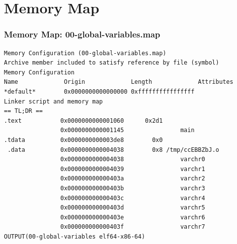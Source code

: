 \documentclass[xcolor=table, notheorems, hyperref={pdfpagelabels=false}]{beamer}
\begin{document}
\section{Memory Map}
\begin{frame}[fragile]
\frametitle{Memory Map: 00-global-variables.map}
\begin{lstlisting}[basicstyle=\ttfamily\footnotesize]
Memory Configuration (00-global-variables.map)
Archive member included to satisfy reference by file (symbol)
Memory Configuration
Name             Origin             Length             Attributes
*default*        0x0000000000000000 0xffffffffffffffff
Linker script and memory map
== TL;DR ==
.text           0x0000000000001060      0x2d1
                0x0000000000001145                main
.tdata          0x0000000000003de8        0x0
 .data          0x0000000000004038        0x8 /tmp/ccEBBZbJ.o
                0x0000000000004038                varchr0
                0x0000000000004039                varchr1
                0x000000000000403a                varchr2
                0x000000000000403b                varchr3
                0x000000000000403c                varchr4
                0x000000000000403d                varchr5
                0x000000000000403e                varchr6
                0x000000000000403f                varchr7
OUTPUT(00-global-variables elf64-x86-64)

\end{lstlisting}

\end{frame}

\end{document}
